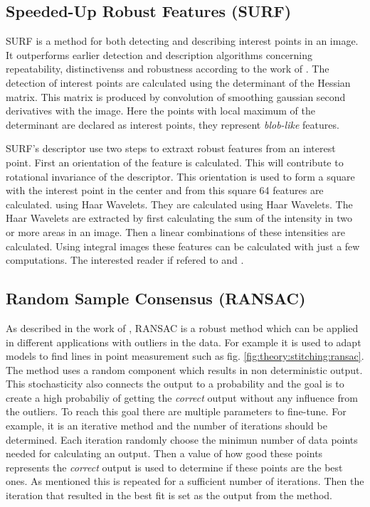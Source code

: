 \subsection{Speeded-Up Robust Features (SURF)}
SURF is a method for both detecting and describing interest points in an image.
It outperforms earlier detection and description algorithms concerning repeatability, distinctivenss and robustness according to the work of \cite{SURF}.
The detection of interest points are calculated using the determinant of the Hessian matrix.
This matrix is produced by convolution of smoothing gaussian second derivatives with the image.
Here the points with local maximum of the determinant are declared as interest points, they represent {\it blob-like} features.

SURF's descriptor use two steps to extraxt robust features from an interest point.
First an orientation of the feature is calculated.
This will contribute to rotational invariance of the descriptor.
This orientation is used to form a square with the interest point in the center and from this square 64 features are calculated. using Haar Wavelets.
They are calculated using Haar Wavelets.
The Haar Wavelets are extracted by first calculating the sum of the intensity in two or more areas in an image.
Then a linear combinations of these intensities are calculated.
Using integral images these features can be calculated with just a few computations.
The interested reader if refered to \cite{SURF} and \cite{Viola2004}.

\subsection{Random Sample Consensus (RANSAC)}
As described in the work of \cite{RANSAC}, RANSAC is a robust method which can be applied in different applications with outliers in the data.
For example it is used to adapt models to find lines in point measurement such as fig. \ref{fig:theory:stitching:ransac}.
The method uses a random component which results in non deterministic output.
This stochasticity also connects the output to a probability and the goal is to create a high probabiliy of getting the {\it correct} output without any influence from the outliers.
To reach this goal there are multiple parameters to fine-tune.
For example, it is an iterative method and the number of iterations should be determined.
Each iteration randomly choose the minimun number of data points needed for calculating an output.
Then a value of how good these points represents the {\it correct} output is used to determine if these points are the best ones.
As mentioned this is repeated for a sufficient number of iterations.
Then the iteration that resulted in the best fit is set as the output from the method.

